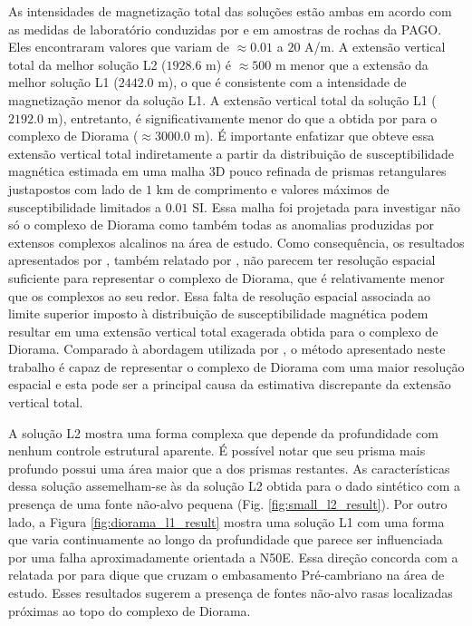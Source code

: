 As intensidades de magnetização total das soluções estão ambas em acordo com as medidas de laboratório conduzidas por \citet{dutra2011} e \citet{dutra_etal2014} 
em amostras de rochas da PAGO. Eles encontraram valores que variam de $\approx 0.01$ a $20$ A/m.
A extensão vertical total da melhor solução L2 ($1928.6$ m) é $\approx 500$ m 
menor que a extensão da melhor solução L1 ($2442.0$ m), o que é consistente com a intensidade de magnetização menor da solução L1.
A extensão vertical total da solução L1 ($2192.0$ m), entretanto, é significativamente menor do que a obtida por \citet[][Fig. 4.9, p. 78]{dutra2011} para o complexo de Diorama ($\approx 3000.0$ m). 
É importante enfatizar que \cite{dutra2011} obteve essa extensão vertical total indiretamente a partir da distribuição de susceptibilidade magnética estimada em uma malha 3D pouco refinada de prismas retangulares justapostos com lado de $1$ km de comprimento e valores máximos de susceptibilidade limitados a $0.01$ SI.
Essa malha foi projetada para investigar não só o complexo de Diorama como também todas as anomalias produzidas por extensos complexos alcalinos na área de estudo. Como consequência, os resultados apresentados por
\citet{dutra2011}, também relatado por \citet{marangoni_mantovani2013}, não parecem ter resolução espacial suficiente para representar o complexo de Diorama, que é relativamente menor que os complexos ao seu redor.
Essa falta de resolução espacial associada ao limite superior imposto à distribuição de susceptibilidade magnética podem resultar em uma extensão vertical total exagerada obtida para o complexo de Diorama.
Comparado à abordagem utilizada por \citet{dutra2011}, o método apresentado neste trabalho é capaz de representar o complexo de Diorama com uma maior resolução espacial e esta pode ser a principal causa da estimativa discrepante da extensão vertical total.

A solução L2 mostra uma forma complexa que depende da profundidade com nenhum controle estrutural aparente. É possível notar que seu prisma mais profundo possui uma área maior que a dos prismas restantes. As características dessa solução assemelham-se às da solução L2 obtida para o dado sintético com a presença de uma fonte não-alvo pequena (Fig. \ref{fig:small_l2_result}).
Por outro lado, a Figura \ref{fig:diorama_l1_result} mostra uma solução L1 com uma forma que varia continuamente ao longo da profundidade que parece ser influenciada por uma falha aproximadamente orientada a N50E. Essa direção concorda com a relatada por
\citet{junqueirabrod_etal2002} para dique que cruzam o embasamento Pré-cambriano na área de estudo.
Esses resultados sugerem a presença de fontes não-alvo rasas localizadas próximas ao topo do complexo de Diorama.


